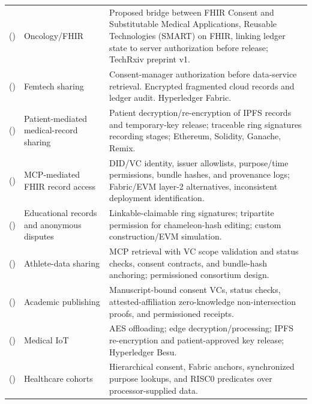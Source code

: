 \begin{longtable}{@{}>{\raggedright\arraybackslash}m{}>{\raggedright\arraybackslash}m{}>{\raggedright\arraybackslash}m{}@{}}
\addlinespace[5pt]
\cite{updateOke2025FHIRConsent} (\citeyear{updateOke2025FHIRConsent}) & Oncology/FHIR & Proposed bridge between FHIR Consent and Substitutable Medical Applications, Reusable Technologies (SMART) on FHIR, linking ledger state to server authorization before release; TechRxiv preprint v1. \\
\addlinespace[5pt]
\cite{updateTomaz2025PrivacHer} (\citeyear{updateTomaz2025PrivacHer}) & Femtech sharing & Consent-manager authorization before data-service retrieval. Encrypted fragmented cloud records and ledger audit. Hyperledger Fabric. \\
\addlinespace[5pt]
\cite{updateQu2025ConsentEMR} (\citeyear{updateQu2025ConsentEMR}) & Patient-mediated medical-record sharing & Patient decryption/re-encryption of IPFS records and temporary-key release; traceable ring signatures recording stages; Ethereum, Solidity, Ganache, Remix. \\
\addlinespace[5pt]
\cite{updateFerreira2025MCPFHIR} (\citeyear{updateFerreira2025MCPFHIR}) & MCP-mediated FHIR record access & DID/VC identity, issuer allowlists, purpose/time permissions, bundle hashes, and provenance logs; Fabric/EVM layer-2 alternatives, inconsistent deployment identification. \\
\addlinespace[5pt]
\cite{updateLu2025RedactableEducation} (\citeyear{updateLu2025RedactableEducation}) & Educational records and anonymous disputes & Linkable-claimable ring signatures; tripartite permission for chameleon-hash editing; custom construction/EVM simulation. \\
\addlinespace[5pt]
\cite{updateFerreira2026SportsConsent} (\citeyear{updateFerreira2026SportsConsent}) & Athlete-data sharing & MCP retrieval with VC scope validation and status checks, consent contracts, and bundle-hash anchoring; permissioned consortium design. \\
\addlinespace[5pt]
\cite{updateAlSabahi2026AuthorshipConsent} (\citeyear{updateAlSabahi2026AuthorshipConsent}) & Academic publishing & Manuscript-bound consent VCs, status checks, attested-affiliation zero-knowledge non-intersection proofs, and permissioned receipts. \\
\addlinespace[5pt]
\cite{updateCh2026ConsentOffloading} (\citeyear{updateCh2026ConsentOffloading}) & Medical IoT & AES offloading; edge decryption/processing; IPFS re-encryption and patient-approved key release; Hyperledger Besu. \\
\addlinespace[5pt]
\cite{updateGupta2026ScalableConsent} (\citeyear{updateGupta2026ScalableConsent}) & Healthcare cohorts & Hierarchical consent, Fabric anchors, synchronized purpose lookups, and RISC0 predicates over processor-supplied data. \\

\end{longtable}
